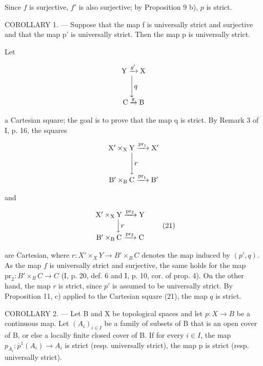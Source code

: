 Since \(f\) is surjective, \(f'\) is also surjective; by Proposition 9 b), \(p\) is strict.

COROLLARY 1. --- Suppose that the map f is universally strict and surjective and that the map p' is universally strict. Then the map p is universally strict.

Let

\[
\begin{array}{c} \mathrm{Y} \xrightarrow {g ^ {\prime}} \mathrm{X} \\ \Biggl \downarrow q \\ \mathrm{C} \xrightarrow {g} \mathrm{B} \end{array}
\]

a Cartesian square; the goal is to prove that the map q is strict. By Remark 3 of I, p. 16, the squares

\[
\begin{array}{c} \mathrm {X^ {\prime}} \times_ {\mathrm{X}} \mathrm{Y} \xrightarrow {\mathrm{pr} _ {1}} \mathrm {X^ {\prime}} \\ \Biggl \downarrow r \\ \mathrm {B^ {\prime}} \times_ {\mathrm{B}} \mathrm{C} \xrightarrow {\mathrm{pr} _ {1}} \mathrm {B^ {\prime}} \end{array}
\]

and

\[
\begin{array}{c} \mathrm {X^ {\prime} \times_ {X} Y\xrightarrow {pr_ {2}} Y} \\ \Big \downarrow r \\ \mathrm {B^ {\prime} \times_ {B} C\xrightarrow {pr_ {2}} C} \end{array}\tag{21}
\]

are Cartesian, where \(r \colon X' \times_{X} Y \to B' \times_{B} C\) denotes the map induced by \((p', q)\). As the map \(f\) is universally strict and surjective, the same holds for the map \(\mathrm{pr}_2 \colon B' \times_{B} C \to C\) (I, p. 20, def. 6 and I, p. 10, cor. of prop. 4). On the other hand, the map \(r\) is strict, since \(p'\) is assumed to be universally strict. By Proposition 11, c) applied to the Cartesian square (21), the map \(q\) is strict.

COROLLARY 2. --- Let B and X be topological spaces and let \(p\colon X \to B\) be a continuous map. Let \((A_i)_{i \in I}\) be a family of subsets of B that is an open cover of B, or else a locally finite closed cover of B. If for every \(i \in I\), the map \(p_{A_i}\colon \overline{p}^1(A_i) \to A_i\) is strict (resp. universally strict), the map p is strict (resp. universally strict).

